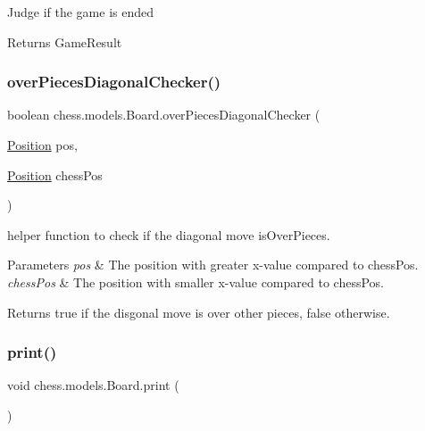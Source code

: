 Judge if the game is ended

\begin{DoxyReturn}{Returns}
Game\+Result 
\end{DoxyReturn}
\mbox{\label{classchess_1_1models_1_1_board_ade8f6def7998bb1bd22923e09a8a8c8b}} 
\subsubsection{\texorpdfstring{over\+Pieces\+Diagonal\+Checker()}{overPiecesDiagonalChecker()}}
{\footnotesize\ttfamily boolean chess.\+models.\+Board.\+over\+Pieces\+Diagonal\+Checker (\begin{DoxyParamCaption}\item[{\mbox{\hyperlink{classchess_1_1models_1_1_position}{Position}}}]{pos,  }\item[{\mbox{\hyperlink{classchess_1_1models_1_1_position}{Position}}}]{chess\+Pos }\end{DoxyParamCaption})\hspace{0.3cm}{\ttfamily [private]}}

helper function to check if the diagonal move is\+Over\+Pieces. 
\begin{DoxyParams}{Parameters}
{\em pos} & The position with greater x-\/value compared to chess\+Pos. \\
\hline
{\em chess\+Pos} & The position with smaller x-\/value compared to chess\+Pos. \\
\hline
\end{DoxyParams}
\begin{DoxyReturn}{Returns}
true if the disgonal move is over other pieces, false otherwise. 
\end{DoxyReturn}
\mbox{\label{classchess_1_1models_1_1_board_af22da20d051a6cc31c6730e5dc80d81e}} 
\subsubsection{\texorpdfstring{print()}{print()}}
{\footnotesize\ttfamily void chess.\+models.\+Board.\+print (\begin{DoxyParamCaption}{ }\end{DoxyParamCaption})}

